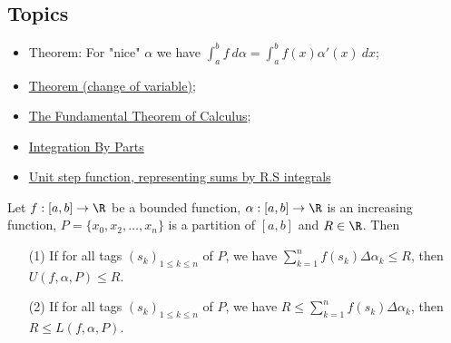 \subsection{Topics}

\begin{itemize}
    \item Theorem: For "nice" \( \alpha \) we have \( \displaystyle \int_{ a }^{ b }  f  \ d \alpha  = \int_{ a }^{ b }  f(x) \alpha'(x) \ dx \);
    \item {\hyperref[Theorem (change of variable)]{Theorem (change of variable)}};
    \item {\hyperref[The Fundamental Theorem of Calculus]{The Fundamental Theorem of Calculus}}; 
    \item {\hyperref[Integration By Parts]{Integration By Parts}} 
    \item {\hyperref[Unit step function, representing sums by R.S integrals]{Unit step function, representing sums by R.S integrals}} 
\end{itemize}

\begin{lemma}
    Let \( f: [a,b] \to \R  \) be a bounded function, \( \alpha: [a,b] \to \R  \) is an increasing function, \( P = \{ {x}_{0}, {x}_{2}, \dots, {x}_{n} \}  \) is a partition of \( [a,b] \) and \( R \in \R  \). Then  
    \begin{enumerate}
        \item[(1)] If for all tags \( ({s}_{k })_{1 \leq k \leq n }  \) of \( P  \), we have \( \sum_{ k=1  }^{ n } f({s}_{k}) \Delta {\alpha}_{k } \leq R  \), then \( U(f,\alpha,P) \leq R  \).
        \item[(2)] If for all tags \( ({s}_{k})_{1 \leq k \leq n } \) of \( P  \), we have \( R \leq \sum_{ k=1  }^{ n } f({s}_{k}) \Delta {\alpha}_{k } \), then \( R \leq L(f,\alpha, P) \).
    \end{enumerate}
\end{lemma}

